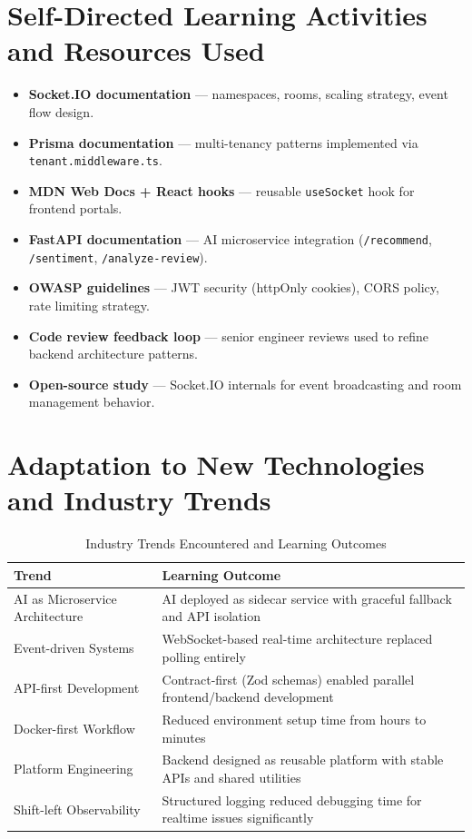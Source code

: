 \section{Self-Directed Learning Activities and Resources Used}

\begin{itemize}
\item \textbf{Socket.IO documentation} --- namespaces, rooms, scaling strategy, event flow design.
\item \textbf{Prisma documentation} --- multi-tenancy patterns implemented via \texttt{tenant.middleware.ts}.
\item \textbf{MDN Web Docs + React hooks} --- reusable \texttt{useSocket} hook for frontend portals.
\item \textbf{FastAPI documentation} --- AI microservice integration (\texttt{/recommend}, \texttt{/sentiment}, \texttt{/analyze-review}).
\item \textbf{OWASP guidelines} --- JWT security (httpOnly cookies), CORS policy, rate limiting strategy.
\item \textbf{Code review feedback loop} --- senior engineer reviews used to refine backend architecture patterns.
\item \textbf{Open-source study} --- Socket.IO internals for event broadcasting and room management behavior.
\end{itemize}

\section{Adaptation to New Technologies and Industry Trends}

\begin{table}[H]
\centering
\caption{Industry Trends Encountered and Learning Outcomes}
\label{tab:trends_ch8}
\begin{tabularx}{\textwidth}{@{}p{}p{}@{}}
\toprule
\textbf{Trend} & \textbf{Learning Outcome} \\
\midrule

AI as Microservice Architecture &
AI deployed as sidecar service with graceful fallback and API isolation \\

Event-driven Systems &
WebSocket-based real-time architecture replaced polling entirely \\

API-first Development &
Contract-first (Zod schemas) enabled parallel frontend/backend development \\

Docker-first Workflow &
Reduced environment setup time from hours to minutes \\

Platform Engineering &
Backend designed as reusable platform with stable APIs and shared utilities \\

Shift-left Observability &
Structured logging reduced debugging time for realtime issues significantly \\

\bottomrule
\end{tabularx}
\end{table}

